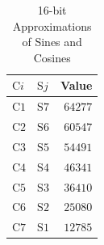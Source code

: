 \documentclass[9pt,letterpaper]{book}
\newcommand{\locvar}[1]{\ensuremath{\mathrm{#1}}}
\numberwithin{equation}{chapter}
\numberwithin{figure}{chapter}
\numberwithin{table}{chapter}
\begin{document}
\begin{table}[htbp]
\begin{center}
\begin{tabular}{llr}\toprule
$\locvar{C}i$  & $\locvar{S}j$ & Value   \\\midrule
$\locvar{C1}$  & $\locvar{S7}$ & $64277$ \\
$\locvar{C2}$  & $\locvar{S6}$ & $60547$ \\
$\locvar{C3}$  & $\locvar{S5}$ & $54491$ \\
$\locvar{C4}$  & $\locvar{S4}$ & $46341$ \\
$\locvar{C5}$  & $\locvar{S3}$ & $36410$ \\
$\locvar{C6}$  & $\locvar{S2}$ & $25080$ \\
$\locvar{C7}$  & $\locvar{S1}$ & $12785$ \\
\bottomrule\end{tabular}
\end{center}
\caption{16-bit Approximations of Sines and Cosines}
\label{tab:dct-consts}
\end{table}
\end{document}

